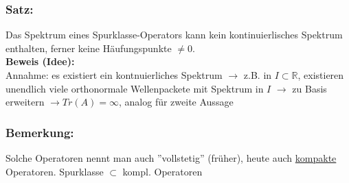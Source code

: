 \documentclass[twoside,a4paper]{scrartcl}
\newcommand{\R}{\mathbb{R}}
\renewcommand{\1}{\mathds{1}}
\newcommand{\ra}{\rightarrow}
\renewcommand{\R}{\mathbb{R}}
\begin{document}
\subsubsection*{Satz:}
Das Spektrum eines Spurklasse-Operators kann kein kontinuierlisches Spektrum enthalten, ferner keine Häufungspunkte $\neq 0$.\\
\textbf{Beweis (Idee):}\\
Annahme: es existiert ein kontnuierliches Spektrum $\ra$ z.B. in $I \subset \R$, existieren unendlich viele orthonormale Wellenpackete mit Spektrum in $I$ $\ra$ zu Basis erweitern $\ra Tr(A)=\infty$, analog für zweite Aussage
\subsubsection*{Bemerkung:}
Solche Operatoren nennt man auch ''vollstetig'' (früher), heute auch \underline{kompakte} Operatoren. Spurklasse $\subset$ kompl. Operatoren
\end{document}

